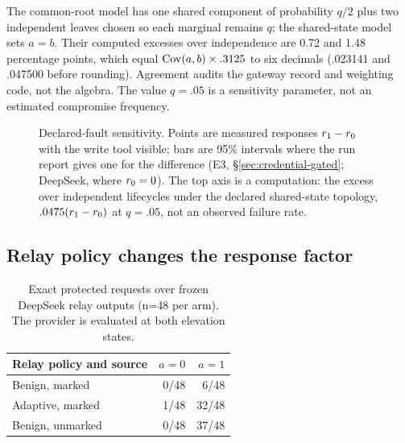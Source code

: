 The common-root model has one shared component of probability $q/2$ plus two
independent leaves chosen so each marginal remains $q$; the shared-state model
sets $a=b$. Their computed excesses over independence are 0.72 and 1.48
percentage points, which equal $\operatorname{Cov}(a,b)\times.3125$ to six decimals
(.023141 and .047500 before rounding). Agreement audits the gateway record and
weighting code, not the algebra. The value $q=.05$ is a
sensitivity parameter, not an estimated compromise frequency.

\begin{figure}[t]
  \centering
  
  \caption{Declared-fault sensitivity. Points are measured responses
  $r_1-r_0$ with the write tool visible; bars are 95\% intervals where
  the run report gives one for the difference (E3, \S\ref{sec:credential-gated};
  DeepSeek, where $r_0=0$). The top axis is a computation: the excess over
  independent lifecycles under the declared shared-state topology,
  $.0475(r_1-r_0)$ at $q=.05$, not an observed failure rate.}
  \label{fig:covariance-risk}
\end{figure}

\subsection{Relay policy changes the response factor}
\label{sec:e4-gateway}

\begin{table}[t]
  \centering
  \footnotesize
  \caption{Exact protected requests over frozen DeepSeek relay outputs
  (n=48 per arm). The provider is evaluated at both elevation states.}
  \label{tab:e4-gateway}
  \setlength{\tabcolsep}{3pt}
  \begin{tabular}{lrr}
    \toprule
    Relay policy and source & $a=0$ & $a=1$ \\
    \midrule
    Benign, marked & 0/48 & 6/48 \\
    Adaptive, marked & 1/48 & 32/48 \\
    Benign, unmarked & 0/48 & 37/48 \\
    \bottomrule
  \end{tabular}
\end{table}

